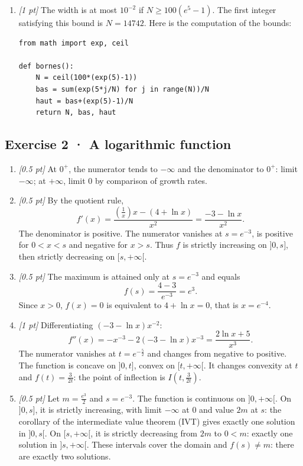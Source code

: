 \begin{enumerate}

\item \textit{[1 pt]} The width is at most $10^{-2}$ if $N\ge100(e^{5}-1)$. The first integer satisfying this bound is $N=14742$. Here is the computation of the bounds:
\begin{lstlisting}
from math import exp, ceil

def bornes():
    N = ceil(100*(exp(5)-1))
    bas = sum(exp(5*j/N) for j in range(N))/N
    haut = bas+(exp(5)-1)/N
    return N, bas, haut
\end{lstlisting}


\end{enumerate}

\subsection*{Exercise 2 · A logarithmic function}\begin{enumerate}

\item \textit{[0.5 pt]} At $0^+$, the numerator tends to $-\infty$ and the denominator to $0^+$: limit $-\infty$; at $+\infty$, limit $0$ by comparison of growth rates.

\item \textit{[0.5 pt]} By the quotient rule,
\[f'(x)=\frac{(\frac{1}{x})x-(4+\ln x)}{x^2}=\frac{-3-\ln x}{x^2}.\]
The denominator is positive. The numerator vanishes at $s=e^{-3}$, is positive for $0<x<s$ and negative for $x>s$. Thus $f$ is strictly increasing on $]0,s]$, then strictly decreasing on $[s,+\infty[$.

\item \textit{[0.5 pt]} The maximum is attained only at $s=e^{-3}$ and equals
\[f(s)=\frac{4- 3}{e^{-3}}=e^{3}.\]
Since $x>0$, $f(x)=0$ is equivalent to $4+\ln x=0$, that is $x=e^{-4}$.

\item \textit{[1 pt]} Differentiating $(-3-\ln x)x^{-2}$:
\[f''(x)=-x^{-3}-2(-3-\ln x)x^{-3}=\frac{2\ln x+5}{x^3}.\]
The numerator vanishes at $t=e^{-\frac{5}{2}}$ and changes from negative to positive. The function is concave on $]0,t]$, convex on $[t,+\infty[$. It changes convexity at $t$ and $f(t)=\frac{3}{2t}$: the point of inflection is $I(t,\frac{3}{2t})$.

\item \textit{[0.5 pt]} Let $m=\frac{e^{3}}{2}$ and $s=e^{-3}$. The function is continuous on $]0,+\infty[$. On $]0,s]$, it is strictly increasing, with limit $-\infty$ at $0$ and value $2m$ at $s$: the corollary of the intermediate value theorem (IVT) gives exactly one solution in $]0,s[$. On $[s,+\infty[$, it is strictly decreasing from $2m$ to $0<m$: exactly one solution in $]s,+\infty[$. These intervals cover the domain and $f(s)\ne m$: there are exactly two solutions.


\end{enumerate}
